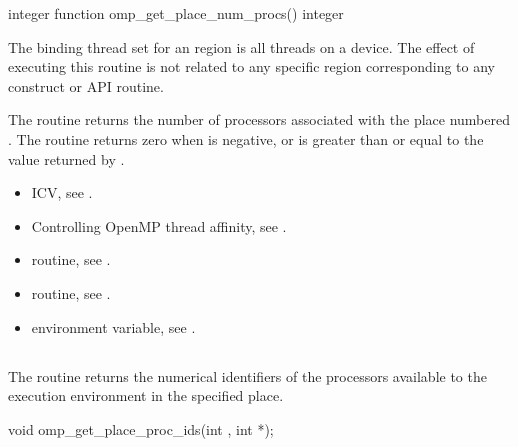 \begin{fortranspecific}
\begin{ompfFunction}
integer function omp_get_place_num_procs()
integer 
\end{ompfFunction}
\end{fortranspecific}

\binding
The binding thread set for an   region is 
all threads on a device. The effect of executing this routine is not 
related to any specific region corresponding to any construct or API routine.

\effect
The  routine returns the number of
processors associated with the place numbered . The
routine returns zero when  is negative, or is greater 
than or equal to the value returned by .

\crossreferences
\begin{itemize}
\item {} ICV, see
.

\item Controlling OpenMP thread affinity, see
.

\item {} routine, see
.

\item {} routine, see
.

\item {} environment variable, see
.
\end{itemize}



\subsection{}
\label{subsec:omp_get_place_proc_ids}

\summary
The  routine returns the numerical 
identifiers of the processors available to the execution environment 
in the specified place.

\format
\begin{ccppspecific}
\begin{ompcFunction}
void omp_get_place_proc_ids(int , int *);
\end{ompcFunction}
\end{ccppspecific}

